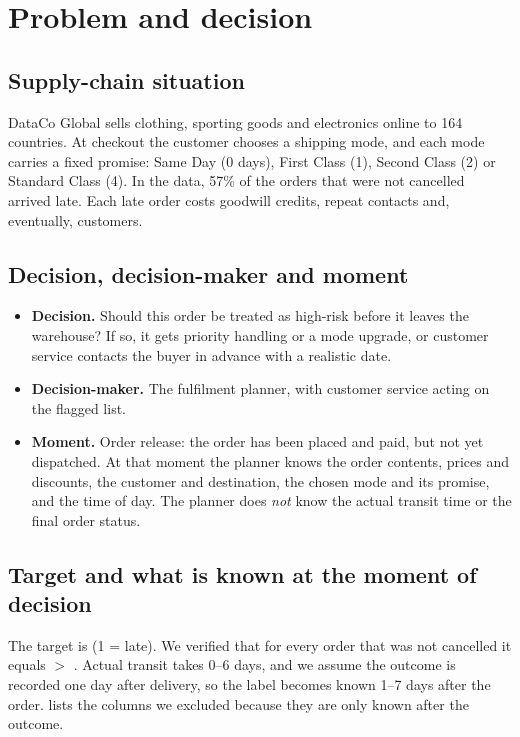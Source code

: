 \section{Problem and decision}
\label{sec:problem}

\subsection{Supply-chain situation}
DataCo Global sells clothing, sporting goods and electronics online to 164 countries. At
checkout the customer chooses a shipping mode, and each mode carries a fixed promise: Same Day
(0 days), First Class (1), Second Class (2) or Standard Class (4). In the data, 57\% of the
orders that were not cancelled arrived late. Each late order costs goodwill credits, repeat
contacts and, eventually, customers.

\subsection{Decision, decision-maker and moment}
\begin{itemize}
  \item \textbf{Decision.} Should this order be treated as high-risk before it leaves the
        warehouse? If so, it gets priority handling or a mode upgrade, or customer service
        contacts the buyer in advance with a realistic date.
  \item \textbf{Decision-maker.} The fulfilment planner, with customer service acting on the
        flagged list.
  \item \textbf{Moment.} Order release: the order has been placed and paid, but not yet
        dispatched. At that moment the planner knows the order contents, prices and discounts,
        the customer and destination, the chosen mode and its promise, and the time of day. The
        planner does \emph{not} know the actual transit time or the final order status.
\end{itemize}

\subsection{Target and what is known at the moment of decision}
The target is  (1 = late). We verified that for every order that was
not cancelled it equals  $>$ . Actual transit takes 0--6 days, and we assume the outcome is recorded one day after delivery,
so the label becomes known 1--7 days after the order.  lists the
columns we excluded because they are only known after the outcome.

